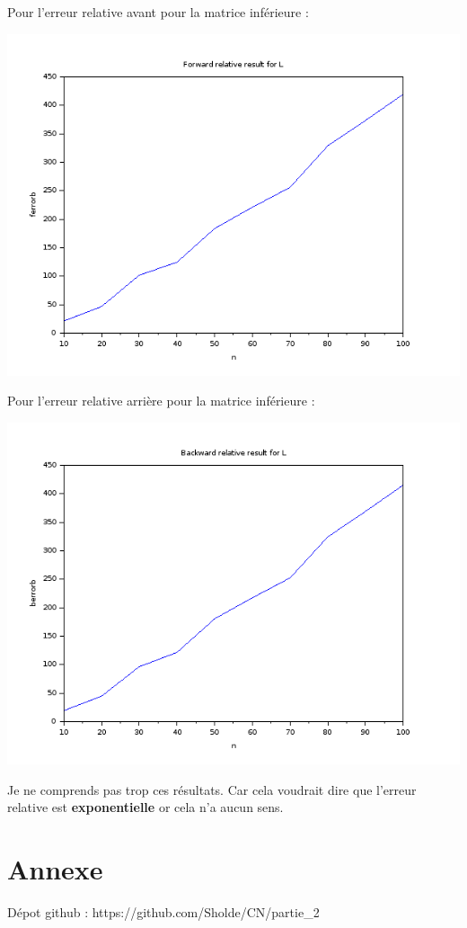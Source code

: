 \documentclass{article}
\begin{document}
Pour l'erreur relative avant pour la matrice inférieure :

\includegraphics[scale=0.5]{img/L_ferrorb.png}

Pour l'erreur relative arrière pour la matrice inférieure :

\includegraphics[scale=0.5]{img/L_berrorb.png}

Je ne comprends pas trop ces résultats. Car cela voudrait dire que
l'erreur relative est \textbf{exponentielle} or cela n'a aucun sens.

\section*{Annexe}

Dépot github : https://github.com/Sholde/CN/partie\_2
\end{document}
